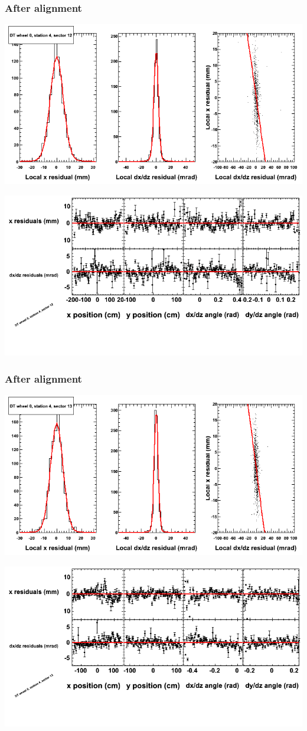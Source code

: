 \documentclass[compress]{beamer}
\begin{document}
\begin{frame}
\frametitle{After alignment}
\includegraphics[width=0.7\linewidth]{NOV4_fitfunctions/MBwhCst4sec12_bellcurves.png}

\includegraphics[width=0.7\linewidth]{NOV4_fitfunctions/MBwhCst4sec12_polynomials.png}
\end{frame}

\begin{frame}
\frametitle{After alignment}
\includegraphics[width=0.7\linewidth]{NOV4_fitfunctions/MBwhCst4sec13_bellcurves.png}

\includegraphics[width=0.7\linewidth]{NOV4_fitfunctions/MBwhCst4sec13_polynomials.png}
\end{frame}
\end{document}
